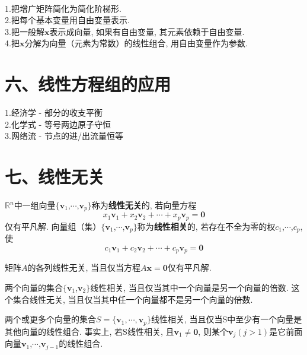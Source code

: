 \begin{law}\ \\
1.把增广矩阵简化为简化阶梯形.\\
2.把每个基本变量用自由变量表示.\\
3.把一般解$\bm{x}$表示成向量, 如果有自由变量, 其元素依赖于自由变量.\\
4.把$\bm{x}$分解为向量（元素为常数）的线性组合, 用自由变量作为参数.
\end{law}\vspace{4ex}

\section{六、线性方程组的应用}
1.经济学 - 部分的收支平衡\\
2.化学式 - 等号两边原子守恒\\
3.网络流 - 节点的进/出流量恒等\\[4ex]

\section{七、线性无关}
\begin{definition}
$\mathbb{R}^n$中一组向量$\{\bm{v}_1$,$\cdots$,$\bm{v}_p\}$称为\textbf{线性无关}的, 若向量方程
\[x_1\bm{v}_1+x_2\bm{v}_2+\cdots+x_p\bm{v}_p=\bm{0}\]
仅有平凡解. 向量组（集）$\{\bm{v}_1$,$\cdots$,$\bm{v}_p\}$称为\textbf{线性相关}的, 若存在不全为零的权$c_1$,$\cdots$,$c_p$, 使
\[c_1\bm{v}_1+c_2\bm{v}_2+\cdots+c_p\bm{v}_p=\bm{0}\]
\end{definition}\vspace{2ex}

\begin{law}
矩阵$A$的各列线性无关, 当且仅当方程$A\bm{x}=\bm{0}$仅有平凡解.
\end{law}\vspace{2ex}

\begin{law}
两个向量的集合$\{\bm{v}_1$,$\bm{v}_2\}$线性相关, 当且仅当其中一个向量是另一个向量的倍数. 这个集合线性无关, 当且仅当其中任一个向量都不是另一个向量的倍数.
\end{law}\vspace{4ex}

\begin{theorem}[线性相关集的特征]
两个或更多个向量的集合$S=\{\bm{v}_1,\cdots,\bm{v}_p\}$线性相关, 当且仅当S中至少有一个向量是其他向量的线性组合. 事实上, 若S线性相关, 且$\bm{v}_1\neq\bm{0}$, 则某个$\bm{v}_j$$(j>1)$是它前面向量$\bm{v}_1$,$\cdots$,$\bm{v}_{j-1}$的线性组合.
\end{theorem}\vspace{4ex}

